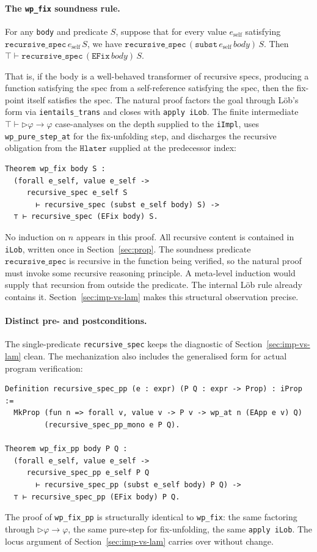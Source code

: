 \paragraph{The \texttt{wp\_fix} soundness rule.}
\begin{theorem}
For any \texttt{body} and predicate $S$, suppose that for every value
$e_{\mathrm{self}}$ satisfying $\mathtt{recursive\_spec}\, e_{\mathrm{self}}\, S$,
we have $\mathtt{recursive\_spec}\, (\mathtt{subst}\, e_{\mathrm{self}}\, body)\, S$.
Then $\top \vdash \mathtt{recursive\_spec}\, (\mathtt{EFix}\, body)\, S$.
\end{theorem}
\noindent
That is, if the body is a well-behaved transformer of recursive specs,
producing a function satisfying the spec from a self-reference
satisfying the spec, then the fix-point itself satisfies the spec.  The
natural proof factors the goal through Löb's form via
\texttt{ientails\_trans} and closes with \texttt{apply iLob}. The
finite intermediate $\top \vdash \triangleright \varphi \to \varphi$
case-analyses on the depth supplied to the \texttt{iImpl}, uses
\texttt{wp\_pure\_step\_at} for the fix-unfolding step, and discharges
the recursive obligation from the $\mathtt{Hlater}$ supplied at the
predecessor index:
\begin{lstlisting}
Theorem wp_fix body S :
  (forall e_self, value e_self ->
     recursive_spec e_self S
       ⊢ recursive_spec (subst e_self body) S) ->
  ⊤ ⊢ recursive_spec (EFix body) S.
\end{lstlisting}
\noindent
No induction on $n$ appears in this proof. All recursive content is
contained in \texttt{iLob}, written once in Section~\ref{sec:prop}.
The soundness predicate $\mathtt{recursive\_spec}$ is recursive in
the function being verified, so the natural proof must invoke some
recursive reasoning principle.  A meta-level induction would supply
that recursion from outside the predicate. The internal Löb rule
already contains it.  Section~\ref{sec:imp-vs-lam} makes this
structural observation precise.

\paragraph{Distinct pre- and postconditions.}
The single-predicate \texttt{recursive\_spec} keeps the diagnostic of
Section~\ref{sec:imp-vs-lam} clean.  The mechanization also includes
the generalised form for actual program verification:
\begin{lstlisting}
Definition recursive_spec_pp (e : expr) (P Q : expr -> Prop) : iProp :=
  MkProp (fun n => forall v, value v -> P v -> wp_at n (EApp e v) Q)
         (recursive_spec_pp_mono e P Q).

Theorem wp_fix_pp body P Q :
  (forall e_self, value e_self ->
     recursive_spec_pp e_self P Q
       ⊢ recursive_spec_pp (subst e_self body) P Q) ->
  ⊤ ⊢ recursive_spec_pp (EFix body) P Q.
\end{lstlisting}
\noindent
The proof of \texttt{wp\_fix\_pp} is structurally identical to
\texttt{wp\_fix}: the same factoring through $\triangleright \varphi
\to \varphi$, the same pure-step for fix-unfolding, the same
\texttt{apply iLob}.  The locus argument of
Section~\ref{sec:imp-vs-lam} carries over without change.

